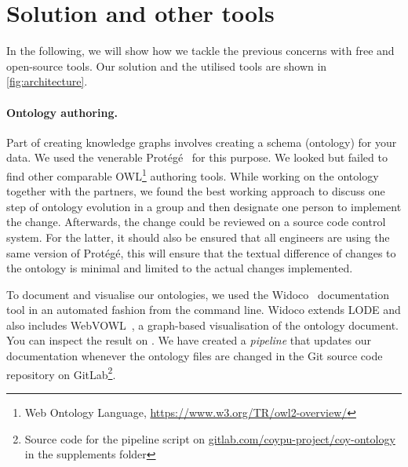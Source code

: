 \documentclass[
hf
]{ceurart}
\begin{document}
\section{Solution and other tools}

In the following, we will show how we tackle the previous concerns with free and open-source tools. Our solution and the utilised tools are shown in \autoref{fig:architecture}.

\paragraph{Ontology authoring.}\label{para:onto}
Part of creating knowledge graphs involves creating a schema (ontology) for your data. We used the venerable Protégé~\cite{musen2015protege} for this purpose. We looked but failed to find other comparable OWL\footnote{Web Ontology Language, \url{https://www.w3.org/TR/owl2-overview/}} authoring tools. While working on the ontology together with the partners, we found the best working approach to discuss one step of ontology evolution in a group and then designate one person to implement the change. Afterwards, the change could be reviewed on a source code control system. For the latter, it should also be ensured that all engineers are using the same version of Protégé, this will ensure that the textual difference of changes to the ontology is minimal and limited to the actual changes implemented.


To document and visualise our ontologies, we used the Widoco~\cite{garijo2017widoco} documentation tool in an automated fashion from the command line.  Widoco extends LODE and also includes WebVOWL~\cite{lohmann2015webvowl}, a graph-based visualisation of the ontology document. You can inspect the result on . We have created a \emph{pipeline} that updates our documentation whenever the ontology files are changed in the Git source code repository on GitLab\footnote{Source code for the pipeline script on \href{https://gitlab.com/coypu-project/coy-ontology/}{gitlab.com/coypu-project/coy-ontology} in the supplements folder}.

\end{document}
